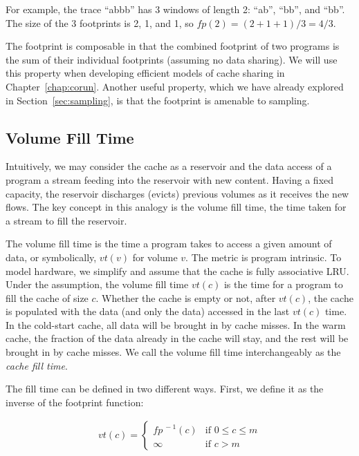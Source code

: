 For example, the trace ``abbb'' has 3 windows of length 2: ``ab'',
``bb'', and ``bb''.  The size of the 3 footprints is 2, 1, and 1, so
$fp(2) = (2+1+1)/3 = 4/3$.  

The footprint is composable in that the combined footprint of two
programs is the sum of their individual footprints (assuming no data
sharing).  We will use this property when developing efficient models
of cache sharing in Chapter~\ref{chap:corun}. Another useful property,
which we have already explored in Section~\ref{sec:sampling}, is that
the footprint is amenable to sampling.

\subsection{Volume Fill Time}
\label{subsec:lf}

Intuitively, we may consider the cache as a reservoir and the data
access of a program a stream feeding into the reservoir with new
content.  Having a fixed capacity, the reservoir discharges (evicts)
previous volumes as it receives the new flows.  The key concept in
this analogy is the volume fill time, the time taken for a stream to
fill the reservoir.

The volume fill time is the time a program takes to access a given
amount of data, or symbolically, $vt(v)$ for volume $v$.  The metric
is program intrinsic.  To model hardware, we simplify and assume that
the cache is fully associative LRU.  Under the assumption, the volume
fill time $vt(c)$ is the time for a program to fill the cache of size
$c$.  Whether the cache is empty or not, after $vt(c)$, the cache
is populated with the data (and only the data) accessed in the last
$vt(c)$ time. In the cold-start cache, all data will be brought in by
cache misses. In the warm cache, the fraction of the data already in
the cache will stay, and the rest will be brought in by cache
misses. We call the volume fill time interchangeably as the
\emph{cache fill time}. 

The fill time can be defined in two different ways. First, we define
it as the inverse of the footprint function:

\begin{align*}
vt(c) = 
\begin{cases}
fp^{\ -1} (c) & \text{if } 0 \le c \le m \\
\infty & \text{if } c > m
\end{cases}
\end{align*}

